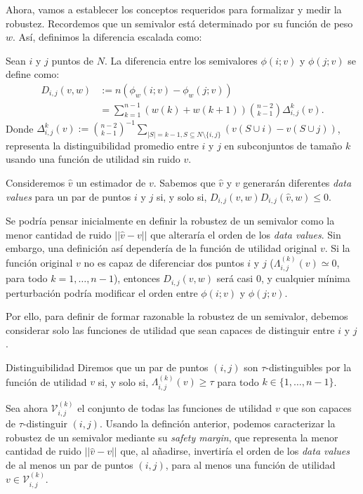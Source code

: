 Ahora, vamos a establecer los conceptos requeridos para
formalizar y medir la robustez. Recordemos que un semivalor
está determinado por su función de peso $w$. Así, definimos
la diferencia escalada como:


\begin{definition}
  Sean $i$ y $j$ puntos de $N$. La diferencia
  entre los semivalores $\phi(i;v)$ y $\phi(j;v)$
  se define como:
  \begin{align*}
    D_{i,j}(v,w)&:= n(\phi_w(i;v)-\phi_w(j;v))\\
    &=\sum_{k=1}^{n-1} (w(k)+w(k+1)) \binom{n-2}{k-1}
    \Delta_{i,j}^k(v).
  \end{align*}
  Donde $\Delta_{i,j}^k(v):=\binom{n-2}{k-1}^{-1} \sum_{|S|=k-1,
  S\subseteq N \setminus \{i,j\}} (v(S \cup i)-v(S \cup j))$,
  representa la distinguibilidad promedio entre $i$ y $j$ en
  subconjuntos de tamaño $k$ usando una función de utilidad
  sin ruido $v$.
\end{definition}

Consideremos $\hat{v}$ un estimador de $v$. Sabemos que
$\hat{v}$ y $v$ generarán diferentes \textit{data values}
para un par de puntos $i$ y $j$ si, y solo si,
$D_{i,j}(v,w)D_{i,j}(\hat{v},w) \leq 0$.

Se podría pensar inicialmente en definir
la robustez de un semivalor como la menor cantidad de ruido
$||\hat{v}-v||$ que alteraría el orden de los
\textit{data values}. Sin embargo, una definición
así dependería de la función de utilidad original $v$.
Si la función original $v$ no es capaz de diferenciar
dos puntos $i$ y $j$ ($\Lambda_{i,j}^{(k)}(v)\simeq 0$, para
todo $k=1,\dots,n-1$), entonces $D_{i,j}(v,w)$ será
casi 0, y cualquier mínima perturbación podría 
modificar el orden entre $\phi(i;v)$ y $\phi(j;v)$. 

Por ello, para definir de formar razonable la
robustez de un semivalor, debemos considerar solo las
funciones de utilidad que sean capaces de distinguir
entre $i$ y $j$.

\begin{definition}{Distinguibilidad}
  Diremos que un par de puntos $(i,j)$ son $\tau$-distinguibles por
  la función de utilidad $v$ si, y solo si, $\Lambda_{i,j}^{(k)}(v) \geq \tau$
  para todo $k \in \{1,\dots,n-1\}$.
\end{definition}

Sea ahora $\mathcal{V}_{i,j}^{(k)}$ el conjunto de todas las funciones
de utilidad $v$ que son capaces de $\tau$-distinguir $(i,j)$. 
Usando la definción anterior, podemos caracterizar la robustez de
un semivalor mediante su \textit{safety margin}, que representa la
menor cantidad de ruido $||\hat{v} - v||$ que, al añadirse,
invertiría el orden de los \textit{data values} de al menos un
par de puntos $(i,j)$, para al menos una función de utilidad $v \in
\mathcal{V}_{i,j}^{(k)}$.

